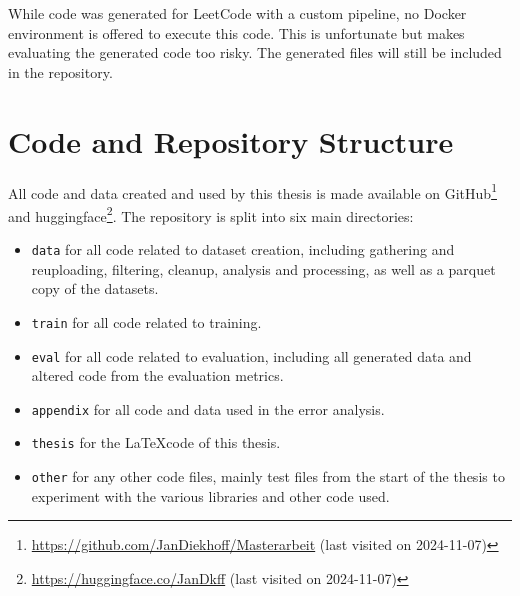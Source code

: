 While code was generated for LeetCode with a custom pipeline, no Docker environment is offered to execute this code.
This is unfortunate but makes evaluating the generated code too risky.
The generated files will still be included in the repository.

\section{Code and Repository Structure}
\label{sec:repo}

All code and data created and used by this thesis is made available on GitHub\footnote{\url{https://github.com/JanDiekhoff/Masterarbeit} (last visited on 2024-11-07)} and huggingface\footnote{\url{https://huggingface.co/JanDkff} (last visited on 2024-11-07)}.
The repository is split into six main directories:
\begin{itemize}
    \item \texttt{data} for all code related to dataset creation, including gathering and reuploading, filtering, cleanup, analysis and processing, as well as a parquet copy of the datasets.
    \item \texttt{train} for all code related to training.
    \item \texttt{eval} for all code related to evaluation, including all generated data and altered code from the evaluation metrics.
    \item \texttt{appendix} for all code and data used in the error analysis.
    \item \texttt{thesis} for the \LaTeX code of this thesis.
    \item \texttt{other} for any other code files, mainly test files from the start of the thesis to experiment with the various libraries and other code used.
\end{itemize}